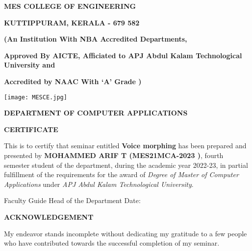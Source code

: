\documentclass[12pt]{report}
\begin{document}
\begin{titlepage}
    \begin{center}
	{\large\bfseries MES COLLEGE OF ENGINEERING\par}
	{\small\bfseries KUTTIPPURAM, KERALA - 679 582\par}
	{\small\bfseries (An Institution With NBA Accredited Departments,\par}
{\small\bfseries Approved By AICTE, Afficiated to APJ Abdul Kalam Technological University and \par}
{\small\bfseries Accredited by NAAC With `A' Grade )\par}
    \vspace{1cm}
    \texttt{[image: MESCE.jpg]}\par\vspace{1cm}
    \vspace{1cm}
    {\large\bfseries DEPARTMENT OF COMPUTER APPLICATIONS\par}
    \vspace{1cm}
    {\large\bfseries CERTIFICATE\par}
    \end{center}
    
    
    This is to certify that seminar entitled  \textbf{Voice morphing}  has been  prepared and presented by \textbf{MOHAMMED ARIF T (MES21MCA-2023 )}, fourth semester student of the department, during the academic year 2022-23, in partial fulfillment of the requirements for the award of \textit{Degree of Master of Computer Applications} under \textit{APJ Abdul Kalam Technological University}.
    
    \vspace{2cm}
    
   
    Faculty Guide \hspace{6cm} Head of the Department  \newline \newline
    Date:
    
    
    
    
\end{titlepage}





\newpage
{\LARGE\bfseries\centering ACKNOWLEDGEMENT \par}
 \vspace{1cm}
\thispagestyle{empty}
\begingroup
\linespread{2.0}
My endeavor stands incomplete without dedicating my gratitude to a few people who have  contributed towards  the successful completion of my seminar.
\end{document}
